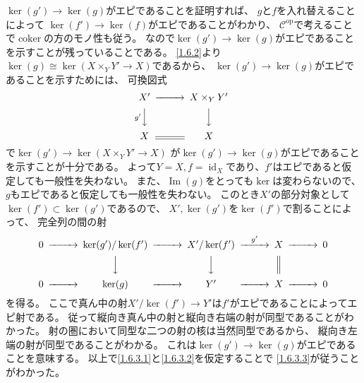 \documentclass[uplatex,dvipdfmx]{jsarticle}
\makeatletter
\theoremstyle{definition}
\renewenvironment{proof}[1][\proofname]{
  \pushQED{\qed}%
  \normalfont \topsep6\p@\@plus6\p@\relax
  \trivlist
  \item[\hskip\labelsep
    #1\@addpunct{\textbf{.}}]\ignorespaces
}{%
  \popQED\endtrivlist\@endpefalse
}
\providecommand{\proofname}{証明}
\DeclareMathOperator{\id}{\mathrm{id}}
\DeclareMathOperator{\im}{\mathrm{Im}}
\newcommand{\op}{\mathrm{op}}
\DeclareMathOperator{\coker}{\mathrm{coker}}
\newcommand\mcC{\mathcal{C}}
\makeatother
\begin{document}
\begin{proof}
  \(\ker(g')\to \ker(g)\)がエピであることを証明すれば、
  \(g\)と\(f\)を入れ替えることによって
  \(\ker(f')\to \ker(f)\)がエピであることがわかり、
  \(\mcC^{\op}\)で考えることで\(\coker\)の方のモノ性も従う。
  なので\(\ker(g')\to \ker(g)\)がエピであることを示すことが残っていることである。
  \ref{1.6.2}より\(\ker(g)\cong \ker(X\times_YY'\to X)\)であるから、
  \(\ker(g')\to \ker(g)\)がエピであることを示すためには、
  可換図式
  \[
  \begin{CD}
    X' @>>> X\times_YY' \\
    @V g' VV @VVV \\
    X @= X
  \end{CD}
  \]
  で\(\ker(g')\to \ker(X\times_YY'\to X)\)
  が\(\ker(g')\to \ker(g)\)がエピであることを示すことが十分である。
  よって\(Y=X,f=\id_X\)であり、\(f'\)はエピであると仮定しても一般性を失わない。
  また、\(\im(g)\)をとっても\(\ker\)は変わらないので、
  \(g\)もエピであると仮定しても一般性を失わない。
  このとき\(X'\)の部分対象として\(\ker(f')\subset \ker(g')\)であるので、
  \(X',\ker(g')\)を\(\ker(f')\)で割ることによって、
  完全列の間の射
  \[
  \begin{CD}
    0 @>>> \ker(g')/\ker(f') @>>> X'/\ker(f') @> g' >> X @>>> 0 \\
    @. @VVV @VVV @| @. \\
    0 @>>> \ker(g) @>>> Y' @>>> X @>>> 0
  \end{CD}
  \]
  を得る。
  ここで真ん中の射\(X'/\ker(f')\to Y'\)は\(f'\)がエピであることによってエピ射である。
  従って縦向き真ん中の射と縦向き右端の射が同型であることがわかった。
  射の圏において同型な二つの射の核は当然同型であるから、
  縦向き左端の射が同型であることがわかる。
  これは\(\ker(g')\to \ker(g)\)がエピであることを意味する。
  以上で\ref{1.6.3.1}と\ref{1.6.3.2}を仮定することで
  \ref{1.6.3.3}が従うことがわかった。


\end{proof}
\end{document}
